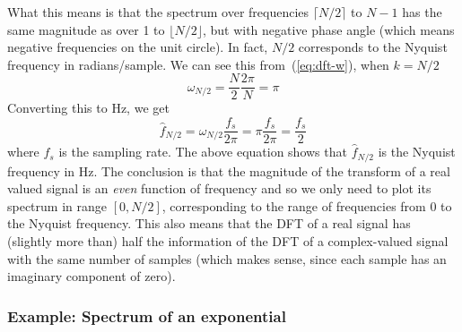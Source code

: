 What this means is that the spectrum over frequencies $\lceil N/2
\rceil$ to $N-1$ has the same magnitude as over 1 to $\lfloor N/2
\rfloor$, but with negative phase angle (which means negative
frequencies on the unit circle). In fact, $N/2$ corresponds to the
Nyquist frequency in radians/sample. We can see this
from~(\ref{eq:dft-w}), when $k=N/2$
\begin{equation}
\hat{\omega}_{N/2}=\frac{N}{2}\frac{2\pi}{N}=\pi
\end{equation}
Converting this to Hz, we get
\begin{equation}
\hat{f}_{N/2} = \hat{\omega}_{N/2}\frac{f_s}{2\pi}
              = \pi\frac{f_s}{2\pi} = \frac{f_s}{2}
\end{equation}
where $f_s$ is the sampling rate. The above equation shows that
$\hat{f}_{N/2}$ is the Nyquist frequency in Hz. The conclusion is that
the magnitude of the transform of a real valued signal is an
\emph{even} function of frequency and so we only need to plot its
spectrum in range $[0, N/2]$, corresponding to the range of
frequencies from 0 to the Nyquist frequency. This also means that the
DFT of a real signal has (slightly more than) half the information of
the DFT of a complex-valued signal with the same number of samples
(which makes sense, since each sample has an imaginary component of
zero).


\subsubsection{Example: Spectrum of an exponential}

